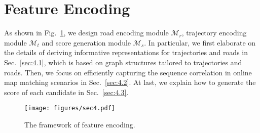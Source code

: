 \section{Feature Encoding}
\label{sec:4}
As shown in Fig.~\ref{fig:sec4}, we design road encoding module $\mathcal{M}_r$, trajectory encoding module $\mathcal{M}_t$ and score generation module $\mathcal{M}_s$. In particular, we first elaborate on the details of deriving informative representations for trajectories and roads in Sec.~\ref{sec:4.1}, which is based on graph structures tailored to trajectories and roads. Then, we focus on efficiently capturing the sequence correlation in online map matching scenarios in Sec.~\ref{sec:4.2}. At last, we explain how to generate the score of each candidate in Sec.~\ref{sec:4.3}.

\begin{figure}
  \centering  
  \texttt{[image: figures/sec4.pdf]}
  \vspace{-0.1in}
  \caption{The framework of feature encoding.}
  \vspace{-0.15in}
  \label{fig:sec4}
\end{figure}

